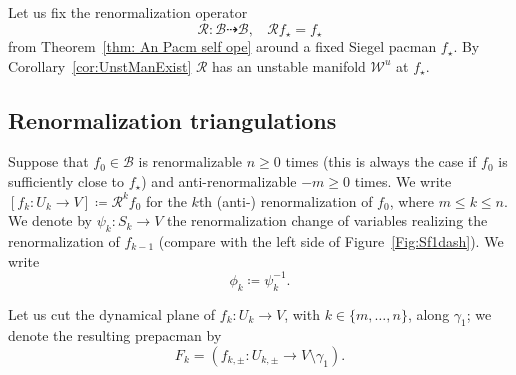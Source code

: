 \documentclass[]{amsart}
\renewcommand{\sp}{{\ \ }}
\newcommand\RR{\mathcal{R}}
\newcommand{\str}{{\star}}
\newcommand\WW{\mathcal{W}}
\newcommand\BB{\mathcal{B}}
\theoremstyle{remark}
\numberwithin{equation}{section}
\theoremstyle{definition}
\begin{document}
Let us fix the renormalization operator \[\RR\colon \BB\dashrightarrow \BB, \sp\sp \RR f_\str=f_\str\] from Theorem~\ref{thm: An Pacm  self ope} around a fixed Siegel pacman $f_\str$. By Corollary~\ref{cor:UnstManExist} $\RR$ has an unstable manifold $\WW^u$ at $f_\str$.









\subsection{Renormalization triangulations}
\label{ss:RenormalTriangul}

Suppose that $f_0\in \BB$ is renormalizable $n\ge 0$ times (this is always the case if $f_0$ is sufficiently close to $f_\str$) and anti-renormalizable $-m\ge 0$ times.
We write $[f_k\colon U_k\to V]\coloneqq \RR^k f_0$ for the $k$th (anti-) renormalization of $f_0$, where $m \le k\le n$. We denote by $\psi_{k}\colon S_k\to V$ the renormalization change of variables realizing the renormalization of $f_{k-1}$ (compare with the left side of Figure~\ref{Fig:Sf1dash}). We write
\[\phi_k\coloneqq \psi_k^{-1}.\]


Let us cut the dynamical plane of $f_k\colon U_k\to V$, with $ k\in \{m, \dots,   n\}$, along $\gamma_1$; we denote the resulting 
prepacman by
\begin{equation}
\label{eq:defn:F_k}
F_{k} = \left(f_{k, \pm } \colon U_{k,\pm}\to V\setminus \gamma_1\right). 
\end{equation}
\end{document}

